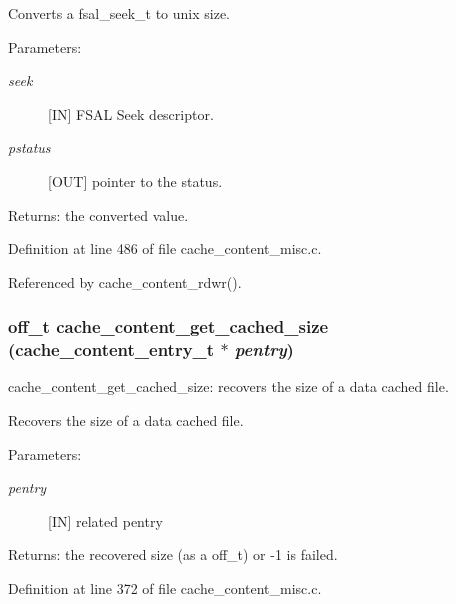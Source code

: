 Converts a fsal\_\-seek\_\-t to unix size.

\begin{Desc}
\item[Parameters:]
\begin{description}
\item[{\em seek}][IN] FSAL Seek descriptor. \item[{\em pstatus}][OUT] pointer to the status.\end{description}
\end{Desc}
\begin{Desc}
\item[Returns:]the converted value. \end{Desc}


Definition at line 486 of file cache\_\-content\_\-misc.c.

Referenced by cache\_\-content\_\-rdwr().
\subsubsection{\setlength{\rightskip}{0pt plus 5cm}off\_\-t cache\_\-content\_\-get\_\-cached\_\-size (cache\_\-content\_\-entry\_\-t $\ast$ {\em pentry})}\label{cache__content__misc_8c_a9}


cache\_\-content\_\-get\_\-cached\_\-size: recovers the size of a data cached file.

Recovers the size of a data cached file.

\begin{Desc}
\item[Parameters:]
\begin{description}
\item[{\em pentry}][IN] related pentry\end{description}
\end{Desc}
\begin{Desc}
\item[Returns:]the recovered size (as a off\_\-t) or -1 is failed. \end{Desc}


Definition at line 372 of file cache\_\-content\_\-misc.c.

